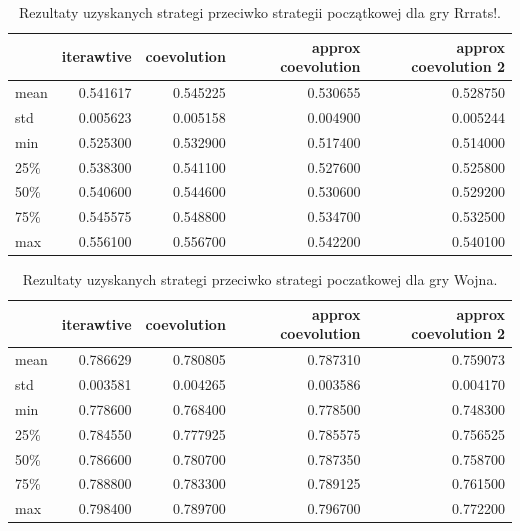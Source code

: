 \documentclass[inzynierska]{pwr_wmat_praca_dyplomowa}
\theoremstyle{plain}
\numberwithin{theorem}{chapter}
\theoremstyle{definition}
\numberwithin{theorem}{chapter}
\begin{document}
	\begin{table}[h]
		\begin{center}
			\begin{tabular}{lrrrr}
				\toprule
				{} &  iterawtive &  coevolution &  approx coevolution &  approx coevolution 2 \\
				\midrule
				mean  &    0.541617 &     0.545225 &             0.530655 &               0.528750 \\
				std   &    0.005623 &     0.005158 &             0.004900 &               0.005244 \\
				min   &    0.525300 &     0.532900 &             0.517400 &               0.514000 \\
				25\%   &    0.538300 &     0.541100 &             0.527600 &               0.525800 \\
				50\%   &    0.540600 &     0.544600 &             0.530600 &               0.529200 \\
				75\%   &    0.545575 &     0.548800 &             0.534700 &               0.532500 \\
				max   &    0.556100 &     0.556700 &             0.542200 &               0.540100 \\
				\bottomrule
			\end{tabular}
			\caption{Rezultaty uzyskanych strategi przeciwko strategii początkowej dla gry Rrrats!.}
			\label{table:war_results}
		\end{center}
	\end{table}
	\begin{table}[h]
		\begin{center}
			\begin{tabular}{lrrrr}
				\toprule
				{} &  iterawtive &  coevolution &  approx coevolution &  approx coevolution 2 \\
				\midrule
				mean  &    0.786629 &     0.780805 &             0.787310 &               0.759073 \\
				std   &    0.003581 &     0.004265 &             0.003586 &               0.004170 \\
				min   &    0.778600 &     0.768400 &             0.778500 &               0.748300 \\
				25\%   &    0.784550 &     0.777925 &             0.785575 &               0.756525 \\
				50\%   &    0.786600 &     0.780700 &             0.787350 &               0.758700 \\
				75\%   &    0.788800 &     0.783300 &             0.789125 &               0.761500 \\
				max   &    0.798400 &     0.789700 &             0.796700 &               0.772200 \\
				\bottomrule
			\end{tabular}
			\caption{Rezultaty uzyskanych strategi przeciwko strategi poczatkowej dla gry Wojna.}
			\label{table:rrrats_results}
		\end{center}
	\end{table}
	
\end{document}
